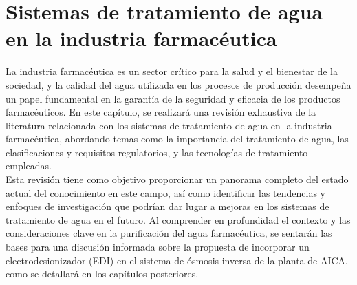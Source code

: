 \section{Sistemas de tratamiento de agua en la industria farmacéutica}

La industria farmacéutica es un sector crítico para la salud y el bienestar de la sociedad, y la calidad del agua utilizada
en los procesos de producción desempeña un papel fundamental en la garantía de la seguridad y eficacia de los productos farmacéuticos. En este capítulo,
se realizará una revisión exhaustiva de la literatura relacionada con los sistemas de tratamiento de agua en la industria farmacéutica, abordando temas
como la importancia del tratamiento de agua, las clasificaciones y requisitos regulatorios, y las tecnologías de tratamiento empleadas.\\

Esta revisión tiene como objetivo proporcionar un panorama completo del estado actual del conocimiento en este campo, así como identificar las tendencias y enfoques de investigación que podrían dar lugar a mejoras en los sistemas de tratamiento de agua en el futuro. Al comprender en profundidad el contexto y las consideraciones clave en la purificación del agua farmacéutica, se sentarán las bases para una discusión informada sobre la propuesta de incorporar un electrodesionizador (EDI) en el sistema de ósmosis inversa de la planta de AICA, como se detallará en los capítulos posteriores.








